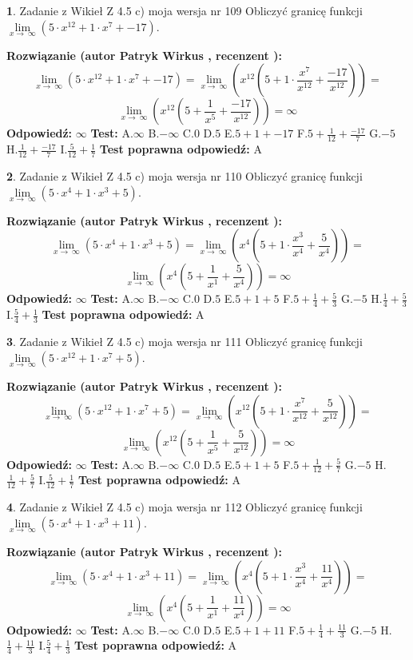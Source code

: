 \documentclass[12pt, a4paper]{article}
\theoremstyle{definition} %
\newtheorem{zad}{}
\newcommand{\zadStart}[1]{\begin{zad}#1\newline}
\newcommand{\zadStop}{\end{zad}}
\newcommand{\rozwStart}[2]{\noindent \textbf{Rozwiązanie (autor #1 , recenzent #2): }\newline}
\newcommand{\rozwStop}{\newline}
\newcommand{\odpStart}{\noindent \textbf{Odpowiedź:}\newline}
\newcommand{\odpStop}{\newline}
\newcommand{\testStart}{\noindent \textbf{Test:}\newline}
\newcommand{\testStop}{\newline}
\newcommand{\kluczStart}{\noindent \textbf{Test poprawna odpowiedź:}\newline}
\newcommand{\kluczStop}{\newline}
\begin{document}
\zadStart{Zadanie z Wikieł Z 4.5 c) moja wersja nr 109}
Obliczyć granicę funkcji  $\lim\limits_{x\to\ \infty}(5 \cdot x^{12}+1 \cdot x^{7}+-17)$.
\zadStop
\rozwStart{Patryk Wirkus}{}
$$\lim\limits_{x\to\ \infty}(5 \cdot x^{12}+1 \cdot x^{7}+-17) = \lim\limits_{x\to\ \infty}(x^{12}(5 +1 \cdot \frac{x^{7}}{x^{12}}+\frac{-17}{x^{12}})) =$$ $$\lim\limits_{x\to\ \infty}(x^{12}(5 +\frac{1}{x^{5}}+\frac{-17}{x^{12}})) =\infty$$
\rozwStop
\odpStart
$\infty$
\odpStop
\testStart
A.$\infty$ B.$-\infty$ C.$0$ D.$5$ E.$5 + 1 + -17$
F.$5+\frac{1}{12}+\frac{-17}{7}$ G.$-5$
H.$\frac{1}{12}+\frac{-17}{7}$
I.$\frac{5}{12}+\frac{1}{7}$
\testStop
\kluczStart
A
\kluczStop



\zadStart{Zadanie z Wikieł Z 4.5 c) moja wersja nr 110}
Obliczyć granicę funkcji  $\lim\limits_{x\to\ \infty}(5 \cdot x^{4}+1 \cdot x^{3}+5)$.
\zadStop
\rozwStart{Patryk Wirkus}{}
$$\lim\limits_{x\to\ \infty}(5 \cdot x^{4}+1 \cdot x^{3}+5) = \lim\limits_{x\to\ \infty}(x^{4}(5 +1 \cdot \frac{x^{3}}{x^{4}}+\frac{5}{x^{4}})) =$$ $$\lim\limits_{x\to\ \infty}(x^{4}(5 +\frac{1}{x^{1}}+\frac{5}{x^{4}})) =\infty$$
\rozwStop
\odpStart
$\infty$
\odpStop
\testStart
A.$\infty$ B.$-\infty$ C.$0$ D.$5$ E.$5 + 1 + 5$
F.$5+\frac{1}{4}+\frac{5}{3}$ G.$-5$
H.$\frac{1}{4}+\frac{5}{3}$
I.$\frac{5}{4}+\frac{1}{3}$
\testStop
\kluczStart
A
\kluczStop



\zadStart{Zadanie z Wikieł Z 4.5 c) moja wersja nr 111}
Obliczyć granicę funkcji  $\lim\limits_{x\to\ \infty}(5 \cdot x^{12}+1 \cdot x^{7}+5)$.
\zadStop
\rozwStart{Patryk Wirkus}{}
$$\lim\limits_{x\to\ \infty}(5 \cdot x^{12}+1 \cdot x^{7}+5) = \lim\limits_{x\to\ \infty}(x^{12}(5 +1 \cdot \frac{x^{7}}{x^{12}}+\frac{5}{x^{12}})) =$$ $$\lim\limits_{x\to\ \infty}(x^{12}(5 +\frac{1}{x^{5}}+\frac{5}{x^{12}})) =\infty$$
\rozwStop
\odpStart
$\infty$
\odpStop
\testStart
A.$\infty$ B.$-\infty$ C.$0$ D.$5$ E.$5 + 1 + 5$
F.$5+\frac{1}{12}+\frac{5}{7}$ G.$-5$
H.$\frac{1}{12}+\frac{5}{7}$
I.$\frac{5}{12}+\frac{1}{7}$
\testStop
\kluczStart
A
\kluczStop



\zadStart{Zadanie z Wikieł Z 4.5 c) moja wersja nr 112}
Obliczyć granicę funkcji  $\lim\limits_{x\to\ \infty}(5 \cdot x^{4}+1 \cdot x^{3}+11)$.
\zadStop
\rozwStart{Patryk Wirkus}{}
$$\lim\limits_{x\to\ \infty}(5 \cdot x^{4}+1 \cdot x^{3}+11) = \lim\limits_{x\to\ \infty}(x^{4}(5 +1 \cdot \frac{x^{3}}{x^{4}}+\frac{11}{x^{4}})) =$$ $$\lim\limits_{x\to\ \infty}(x^{4}(5 +\frac{1}{x^{1}}+\frac{11}{x^{4}})) =\infty$$
\rozwStop
\odpStart
$\infty$
\odpStop
\testStart
A.$\infty$ B.$-\infty$ C.$0$ D.$5$ E.$5 + 1 + 11$
F.$5+\frac{1}{4}+\frac{11}{3}$ G.$-5$
H.$\frac{1}{4}+\frac{11}{3}$
I.$\frac{5}{4}+\frac{1}{3}$
\testStop
\kluczStart
A
\kluczStop
\end{document}
